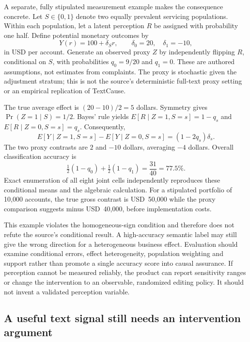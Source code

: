 A separate, fully stipulated measurement example makes the consequence concrete. Let $S\in\{0,1\}$ denote two equally prevalent servicing populations. Within each population, let a latent perception $R$ be assigned with probability one half. Define potential monetary outcomes by
\begin{equation}
 Y(r)=100+\delta_S r,\qquad \delta_0=20,\quad\delta_1=-10,
 \label{eq:exec28-lm-witness}
\end{equation}
in USD per account. Generate an observed proxy $Z$ by independently flipping $R$, conditional on $S$, with probabilities $q_0=9/20$ and $q_1=0$. These are authored assumptions, not estimates from complaints. The proxy is stochastic given the adjustment stratum; this is not the source's deterministic full-text proxy setting or an empirical replication of TextCause.

The true average effect is $(20-10)/2=5$ dollars. Symmetry gives $\Pr(Z=1\mid S)=1/2$. Bayes' rule yields $E[R\mid Z=1,S=s]=1-q_s$ and $E[R\mid Z=0,S=s]=q_s$. Consequently,
\begin{equation}
 E[Y\mid Z=1,S=s]-E[Y\mid Z=0,S=s]=(1-2q_s)\delta_s.
\end{equation}
The two proxy contrasts are $2$ and $-10$ dollars, averaging $-4$ dollars. Overall classification accuracy is
\begin{equation}
 \tfrac12(1-q_0)+\tfrac12(1-q_1)=\frac{31}{40}=77.5\%.
\end{equation}
Exact enumeration of all eight joint cells independently reproduces these conditional means and the algebraic calculation. For a stipulated portfolio of 10,000 accounts, the true gross contrast is USD~50,000 while the proxy comparison suggests minus USD~40,000, before implementation costs.~\citep{exec28_lm_reference}

This example violates the homogeneous-sign condition and therefore does not refute the source's conditional result. A high-accuracy semantic label may still give the wrong direction for a heterogeneous business effect. Evaluation should examine conditional errors, effect heterogeneity, population weighting and support rather than promote a single accuracy score into causal assurance. If perception cannot be measured reliably, the product can report sensitivity ranges or change the intervention to an observable, randomized editing policy. It should not invent a validated perception variable.


\subsection{A useful text signal still needs an intervention argument}
\label{rel66:text-signals}


